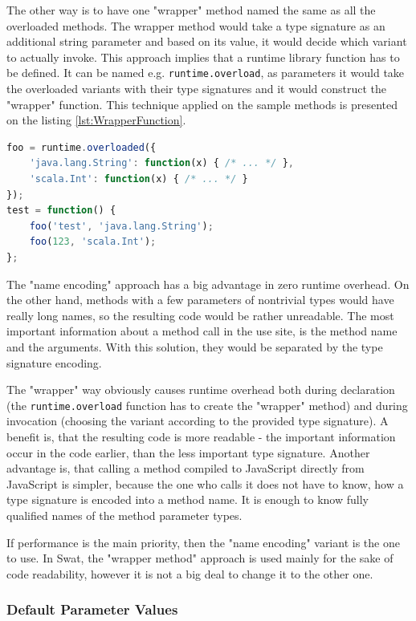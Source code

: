 \documentclass[12pt,a4paper]{report}
\begin{document}
The other way is to have one "wrapper" method named the same as all the overloaded methods. The wrapper method would take a type signature as an additional string parameter and based on its value, it would decide which variant to actually invoke. This approach implies that a runtime library function has to be defined. It can be named e.g. \texttt{runtime.overload}, as parameters it would take the overloaded variants with their type signatures and it would construct the "wrapper" function. This technique applied on the sample methods is presented on the listing \ref{lst:WrapperFunction}.

\begin{lstlisting}[language=JavaScript,caption={Overloading in JavaScript.},label={lst:WrapperFunction}]
foo = runtime.overloaded({
	'java.lang.String': function(x) { /* ... */ },
	'scala.Int': function(x) { /* ... */ }
});
test = function() {
	foo('test', 'java.lang.String');
	foo(123, 'scala.Int');
};
\end{lstlisting}

The "name encoding" approach has a big advantage in zero runtime overhead. On the other hand, methods with a few parameters of nontrivial types would have really long names, so the resulting code would be rather unreadable. The most important information about a method call in the use site, is the method name and the arguments. With this solution, they would be separated by the type signature encoding.

The "wrapper" way obviously causes runtime overhead both during declaration (the \texttt{runtime.overload} function has to create the "wrapper" method) and during invocation (choosing the variant according to the provided type signature). A benefit is, that the resulting code is more readable - the important information occur in the code earlier, than the less important type signature. Another advantage is, that calling a method compiled to JavaScript directly from JavaScript is simpler, because the one who calls it does not have to know, how a type signature is encoded into a method name. It is enough to know fully qualified names of the method parameter types.

If performance is the main priority, then the "name encoding" variant is the one to use. In Swat, the "wrapper method" approach is used mainly for the sake of code readability, however it is not a big deal to change it to the other one.

\subsubsection*{Default Parameter Values}
\end{document}
